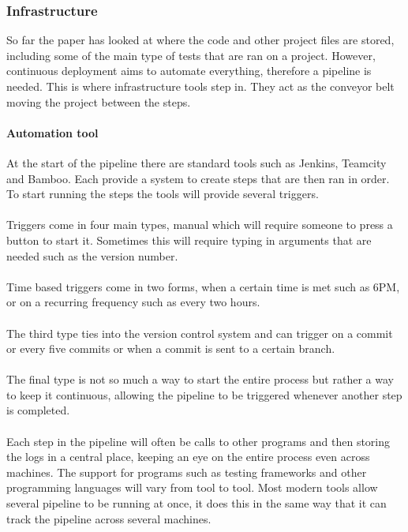 \subsubsection{Infrastructure}

So far the paper has looked at where the code and other project files are stored, including some of the main type of tests that are ran on a project. However, continuous deployment aims to automate everything, therefore a pipeline is needed. This is where infrastructure tools step in. They act as the conveyor belt moving the project between the steps.

\paragraph{Automation tool}
At the start of the pipeline there are standard tools such as Jenkins, Teamcity and Bamboo. Each provide a system to create steps that are then ran in order. To start running the steps the tools will provide several triggers.
\\\\
Triggers come in four main types, manual which will require someone to press a button to start it. Sometimes this will require typing in arguments that are needed such as the version number. 
\\\\
Time based triggers come in two forms, when a certain time is met such as 6PM, or on a recurring frequency such as every two hours.
\\\\
The third type ties into the version control system and can trigger on a commit or every five commits or when a commit is sent to a certain branch. 
\\\\
The final type is not so much a way to start the entire process but rather a way to keep it continuous, allowing the pipeline to be triggered whenever another step is completed.
\\\\
Each step in the pipeline will often be calls to other programs and then storing the logs in a central place, keeping an eye on the entire process even across machines. The support for programs such as testing frameworks and other programming languages will vary from tool to tool. Most modern tools allow several pipeline to be running at once, it does this in the same way that it can track the pipeline across several machines. 
\\\\
